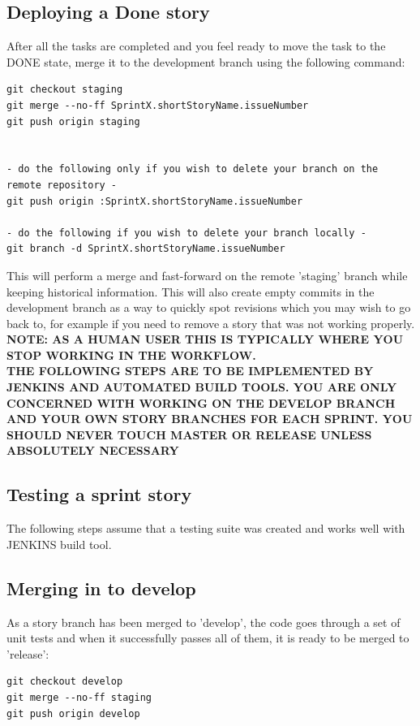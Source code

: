 \documentclass[11pt]{report}
\begin{document}
\subsection{Deploying a Done story}

After all the tasks are completed and you feel ready to move the task to the DONE state, merge it to the development branch using the following command:\\

\begin{verbatim}
git checkout staging
git merge --no-ff SprintX.shortStoryName.issueNumber
git push origin staging


- do the following only if you wish to delete your branch on the remote repository -
git push origin :SprintX.shortStoryName.issueNumber

- do the following if you wish to delete your branch locally -  
git branch -d SprintX.shortStoryName.issueNumber 
\end{verbatim}
This will perform a merge and fast-forward on the remote 'staging' branch while keeping historical information.
This will also create empty commits in the development branch as a way to quickly spot revisions which you may wish to go back to, for example if you need to remove a story that was not working properly.
\newpage
\textbf {NOTE: AS A HUMAN USER THIS IS TYPICALLY WHERE YOU STOP WORKING IN THE WORKFLOW. \\THE FOLLOWING STEPS ARE TO BE IMPLEMENTED BY JENKINS AND AUTOMATED BUILD TOOLS. YOU ARE ONLY CONCERNED WITH WORKING ON THE DEVELOP BRANCH AND YOUR OWN STORY BRANCHES FOR EACH SPRINT. YOU SHOULD NEVER TOUCH MASTER OR RELEASE UNLESS ABSOLUTELY NECESSARY}

\subsection{Testing a sprint story}

The following steps assume that a testing suite was created and works well with JENKINS build tool. 

\subsection{Merging in to develop}
As a story branch has been merged to 'develop', the code goes through a set of unit tests and when it successfully passes all of them, it is ready to be merged to 'release': 
\begin{verbatim}
git checkout develop
git merge --no-ff staging
git push origin develop
\end{verbatim}
\end{document}
